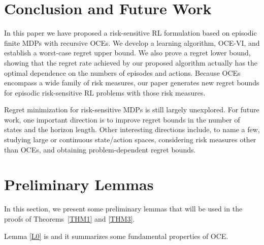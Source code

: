 \documentclass[11pt]{article}
\newcommand{\1}{\mathbbm{1}}
\begin{document}
\section{Conclusion and Future Work}\label{sec:conclusion}


In this paper we have proposed a risk-sensitive RL formulation based on episodic finite MDPs with recursive OCEs. We develop a learning algorithm, OCE-VI,  and establish a worst-case regret upper bound. We also prove a regret lower bound, showing that the regret rate achieved by our proposed algorithm actually has the optimal dependence on the numbers of episodes and actions. Because OCEs encompass a wide family of risk measures, our paper generates new regret bounds for episodic risk-sensitive RL problems with those risk measures. 

Regret minimization for risk-sensitive MDPs is still largely unexplored. For future work, one important direction is to improve regret bounds in the number of states and the horizon length. Other interesting directions include, to name a few, studying large or continuous state/action spaces, considering risk measures other than OCEs, and obtaining problem-dependent regret bounds. 



\newpage




\newpage
\appendix
\onecolumn

\section{Preliminary Lemmas}
In this section, we present some preliminary lemmas that will be used in the proofs of Theorems~\ref{THM1} and \ref{THM3}. %

Lemma \ref{L0} is \citep[Theorem 2.1]{ben2007old} and it summarizes
some fundamental properties of OCE. %
\end{document}
